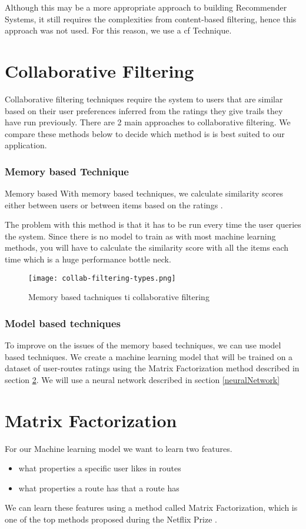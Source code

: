 Although this may be a more appropriate approach to building Recommender Systems, it still requires the complexities from content-based filtering, hence this approach was not used. For this reason, we use a \acrlong{cf} Technique.

\section{Collaborative Filtering}
Collaborative filtering techniques require the system to users that are similar based on their user preferences inferred from the ratings they give trails they have run previously. There are 2 main approaches to collaborative filtering. We compare these methods below to decide which method is is best suited to our application.

\subsubsection{Memory based Technique}
Memory based
With memory based techniques, we calculate similarity scores either between users or between items based on the ratings \cite{wang2006unifying}. 

The problem with this method is that it has to be run every time the user queries the system. Since there is no model to train as with most machine learning methods, you will have to calculate the similarity score with all the items each time which is a huge performance bottle neck.
\begin{figure}[ht]
    \centering
    \texttt{[image: collab-filtering-types.png]}
    \caption{Memory based tachniques ti collaborative filtering}
    \label{fig:collabFilteringTypes}
\end{figure}

\subsubsection{Model based techniques}
To improve on the issues of the memory based techniques, we can use model based techniques. We create a machine learning model that will be trained on a dataset of user-routes ratings using the Matrix Factorization method described in section \ref{matrixFactorization}. We will use a neural network described in section \ref{neuralNetwork}
\section{Matrix Factorization} \label{matrixFactorization}
For our Machine learning model we want to learn two features. 
\begin{itemize}
    \item what properties a specific user likes in routes
    \item what properties a route has that a route has
\end{itemize}
We can learn these features using a method called Matrix Factorization, which is one of the top methods proposed during the Netflix Prize \cite{bell2007lessons}.

